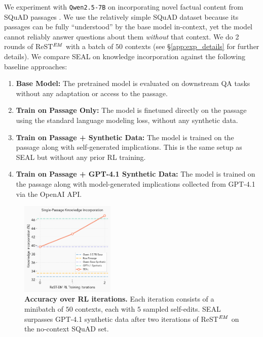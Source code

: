 \documentclass{article}
\newcommand{\methodacronym}{SEAL\xspace}
\begin{document}
We experiment with \texttt{Qwen2.5-7B} on incorporating novel factual content from SQuAD passages \citep{rajpurkar2016squad}. We use the relatively simple SQuAD dataset because its passages can be fully ``understood'' by the base model in-context, yet the model cannot reliably answer questions about them \textit{without} that context. We do 2 rounds of ReST$^\text{\textit{EM}}$ with a batch of $50$ contexts (see \S\ref{app:exp_details} for further details). We compare \methodacronym on knowledge incorporation against the following baseline approaches:

\begin{enumerate}[left=0pt]
\item \textbf{Base Model:} The pretrained model is evaluated on downstream QA tasks without any adaptation or access to the passage.
\vspace{-2pt}
\item \textbf{Train on Passage Only:} The model is finetuned directly on the passage using the standard language modeling loss, without any synthetic data.
\vspace{-2pt}
\item \textbf{Train on Passage + Synthetic Data:} The model is trained on the passage along with self-generated implications. This is the same setup as \methodacronym but without any prior RL training.
\vspace{-2pt}
\item \textbf{Train on Passage + GPT-4.1 Synthetic Data:} The model is trained on the passage along with model-generated implications collected from GPT-4.1 via the OpenAI API.
\end{enumerate}

\begin{figure}
    \centering
    \vspace{-10pt} %
    \includegraphics[width=0.4\textwidth]{figures/RL_training_plot.pdf}
    \vspace{-10pt}
    \caption{\textbf{Accuracy over RL iterations.} Each iteration consists of a minibatch of $50$ contexts, each with $5$ sampled self-edits. \methodacronym{} surpasses GPT-4.1 synthetic data after two iterations of ReST$^\text{\textit{EM}}$ on the no-context SQuAD set.}
    \label{fig:RL_training_plot}
    \vspace{-15pt}
\end{figure}
\end{document}
